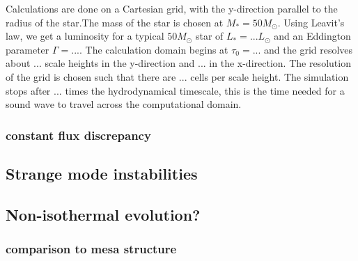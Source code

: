 Calculations are done on a Cartesian grid, with the y-direction parallel to the radius of the star.The mass of the star is chosen at $M_* = 50 M_\odot$. Using Leavit's law, we get a luminosity for a typical $50M_\odot$ star of $L_* = ... L_\odot$ and an Eddington parameter $\Gamma = ...$. The calculation domain begins at $\tau_0 = ...$ and the grid resolves about $...$ scale heights in the y-direction and $...$ in the x-direction. The resolution of the grid is chosen such that there are $...$ cells per scale height. The simulation stops after $...$ times the hydrodynamical timescale, this is the time needed for a sound wave to travel across the computational domain. 

\subsubsection{constant flux discrepancy}

\subsection{Strange mode instabilities}

\subsection{Non-isothermal evolution?}
\subsubsection{comparison to mesa structure}

